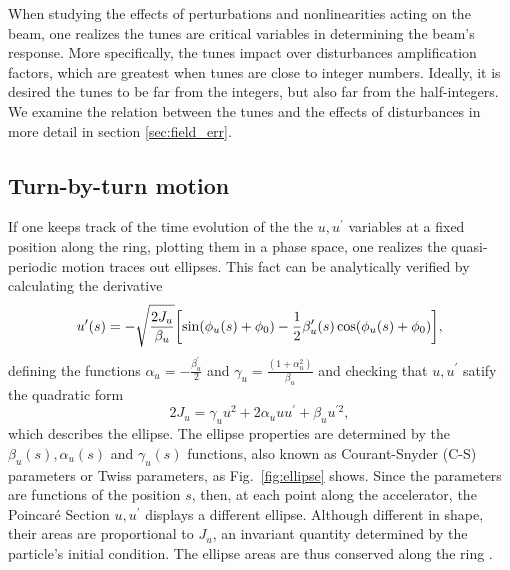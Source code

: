 When studying the effects of perturbations and nonlinearities acting on the beam, one realizes the tunes are critical variables in determining the beam's response. More specifically, the tunes impact over disturbances amplification factors, which are greatest when tunes are close to integer numbers. Ideally, it is desired the tunes to be far from the integers, but also far from the half-integers. We examine the relation  between the tunes and the effects of disturbances in more detail in section \ref{sec:field_err}.

\subsection{Turn-by-turn motion}
If one keeps track of the time evolution of the the $u, u^\prime$ variables at a fixed position along the ring, plotting them in a phase space, one realizes  the quasi-periodic motion traces out ellipses. This fact can be analytically verified by calculating the derivative
    \begin{equation}
        u^{\prime}(s) = - \sqrt{\frac{2J_u}{\beta_u}}\qty[\sin(\phi_u(s) + \phi_0) - \frac{1}{2}\beta_u^\prime(s)\cos(\phi_u(s) + \phi_0)],
        \label{eq:uprime}
    \end{equation}
    defining the functions $\alpha_u = -\frac{\beta_u^\prime}{2}$  and $\gamma_u = \frac{(1+\alpha_u^2)}{\beta_u}$ and checking that $u, u^\prime$ satify the quadratic form
    \begin{equation}
        2J_u=\gamma_u u^{2}+2\alpha_u u u^{\prime}+\beta_u u^{\prime2},
     \end{equation}
which describes the ellipse. The ellipse properties are determined by the $\beta_u(s), \alpha_u(s)$ and $\gamma_u(s)$ functions, also known as Courant-Snyder (C-S) parameters or Twiss parameters, as Fig.~\ref{fig:ellipse} shows. Since the parameters are functions of the position $s$, then, at each point along the accelerator, the Poincaré Section $u, u^\prime$ displays a different ellipse. Although different in shape, their areas are proportional to $J_u$, an invariant quantity determined by the particle's initial condition. The ellipse areas are thus conserved along the ring \cite{lee_accelerator_2004,wiedemann_particle_2015}.

